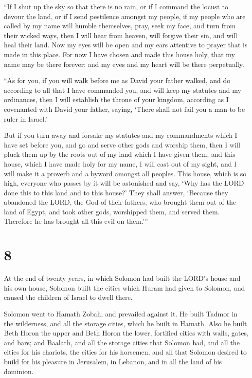  ``If I shut up the sky so that there is no rain, or if I
command the locust to devour the land, or if I send pestilence amongst
my people,  if my people who are called by my name will
humble themselves, pray, seek my face, and turn from their wicked ways,
then I will hear from heaven, will forgive their sin, and will heal
their land.  Now my eyes will be open and my ears attentive
to prayer that is made in this place.  For now I have
chosen and made this house holy, that my name may be there forever; and
my eyes and my heart will be there perpetually.

 ``As for you, if you will walk before me as David your
father walked, and do according to all that I have commanded you, and
will keep my statutes and my ordinances,  then I will
establish the throne of your kingdom, according as I covenanted with
David your father, saying, `There shall not fail you a man to be ruler
in Israel.'

 But if you turn away and forsake my statutes and my
commandments which I have set before you, and go and serve other gods
and worship them,  then I will pluck them up by the roots
out of my land which I have given them; and this house, which I have
made holy for my name, I will cast out of my sight, and I will make it a
proverb and a byword amongst all peoples.  This house,
which is so high, everyone who passes by it will be astonished and say,
`Why has the LORD done this to this land and to this house?'
 They shall answer, `Because they abandoned the LORD, the
God of their fathers, who brought them out of the land of Egypt, and
took other gods, worshipped them, and served them. Therefore he has
brought all this evil on them.'''

\hypertarget{section-7}{%
\section{8}\label{section-7}}

 At the end of twenty years, in which Solomon had built the
LORD's house and his own house,  Solomon built the cities
which Huram had given to Solomon, and caused the children of Israel to
dwell there.

 Solomon went to Hamath Zobah, and prevailed against it.
 He built Tadmor in the wilderness, and all the storage
cities, which he built in Hamath.  Also he built Beth Horon
the upper and Beth Horon the lower, fortified cities with walls, gates,
and bars;  and Baalath, and all the storage cities that
Solomon had, and all the cities for his chariots, the cities for his
horsemen, and all that Solomon desired to build for his pleasure in
Jerusalem, in Lebanon, and in all the land of his dominion.

